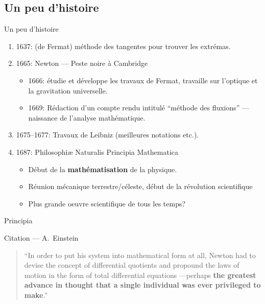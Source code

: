 \documentclass{beamer}
\begin{document}
\subsection{Un peu d'histoire}

\begin{frame}
    {Un peu d'histoire}

    \begin{enumerate}
        \item 1637: (de Fermat) méthode des tangentes pour trouver les extrémas.
            \pause{}
        \item 1665: Newton --- Peste noire à Cambridge\\
            \begin{itemize}
                \item 1666: étudie et développe les travaux de Fermat,
                    travaille sur l'optique et la gravitation universelle.
                \item 1669: Rédaction d'un compte rendu intitulé ``méthode des fluxions'' --- naissance de l'analyse mathématique.
            \end{itemize}
            \pause{}
        \item 1675--1677: Travaux de Leibniz (meilleures notations etc.).
            \pause{}
        \item 1687: Philosophiæ Naturalis Principia Mathematica\\
            \begin{itemize}
                \item Début de la \textbf{mathématisation} de la physique.
                \item Réunion mécanique terrestre/céleste, début de la révolution scientifique
                \item Plus grande oeuvre scientifique de tous les temps?
            \end{itemize}
    \end{enumerate}
\end{frame}

\begin{frame}
    {Principia}
    \begin{exampleblock}
        {Citation --- A.~Einstein}

        \begin{quote}
            ``In order to put his system into mathematical form at all,
            Newton had to devise the concept of differential quotients
            and propound the laws of motion in the form of total differential equations
            —perhaps \textbf{the greatest advance in thought that a single individual was ever privileged to make}.''
        \end{quote}
    \end{exampleblock}
\end{frame}
\end{document}
